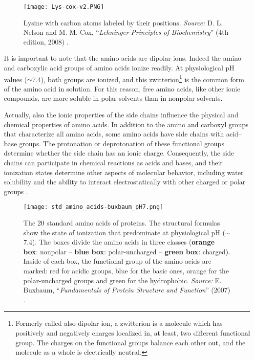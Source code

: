 \begin{figure}[h]
\centering
\begin{minipage}[t]{0.75\textwidth}
\centering
\texttt{[image: Lys-cox-v2.PNG]}

\caption{\small{Lysine with carbon atoms labeled by their positions.
    \textit{Source:} D. L. Nelson and M. M. Cox, ``\textit{Lehninger Principles of Biochemistry}'' (4th edition, 2008) 
    \cite{nelson2008lehninger}.}
}

\label{fig:Lysine}
\end{minipage} 
\end{figure}

It is important to note that the amino acids are dipolar ions. Indeed the amino and carboxylic acid groups of amino acids ionize readily. 
At physiological pH values ($\sim$7.4), both groups are ionized, and this zwitterion\footnote{Formerly called also dipolar ion, a zwitterion is a molecule which has positively and negatively charges localized in, at least, two different functional group. The charges on the functional groups balance each other out, and the molecule as a whole is electrically neutral.} is the common form of the amino acid in solution. 
For this reason, free amino acids, like other ionic compounds, are more soluble in polar solvents than in nonpolar solvents. 

Actually, also the ionic properties of the side chains influence the physical and chemical properties of amino acids. In addition to the amino and carboxyl groups that characterize all amino acids, some amino acids have side chains with acid--base groups. The protonation or deprotonation of these functional groups determine whether the side chain has an ionic charge. Consequently, the side chains can participate in chemical reactions as acids and bases, and their ionization states determine other aspects of molecular behavior, including water solubility and the ability to interact electrostatically with other charged or polar groups
\cite{voet2016fundamentals}.

\begin{figure}[h]
\centering
\begin{minipage}[h]{\textwidth}
\centering
\texttt{[image: std\_amino\_acids-buxbaum\_pH7.png]}

\caption{\small{The 20 standard amino acids of proteins. The structural formulas show the state of ionization that predominate at physiological pH ($\sim$7.4). The boxes divide the amino acids in three classes (\textbf{orange box}: nonpolar -- \textbf{blue box}: polar-uncharged -- \textbf{green box}: charged). Inside of each box, the functional group of the amino acids are marked: red for acidic groups, blue for the basic ones, orange for the polar-uncharged groups and green for the hydrophobic.
    \textit{Source:} E. Buxbaum, ``\textit{Fundamentals of Protein Structure and Function}'' (2007) 
    \cite{buxbaum2007fundamentals}.}
}

\label{fig:StdAminoAcids}
\end{minipage} 
\end{figure}

